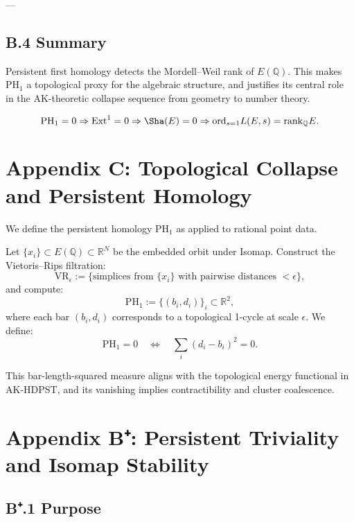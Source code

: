 ---

\subsection*{B.4 Summary}

Persistent first homology detects the Mordell--Weil rank of \( E(\mathbb{Q}) \).  
This makes \( \mathrm{PH}_1 \) a topological proxy for the algebraic structure, and justifies its central role  
in the AK-theoretic collapse sequence from geometry to number theory.

\[
\mathrm{PH}_1 = 0 \Rightarrow \mathrm{Ext}^1 = 0 \Rightarrow \Sha(E) = 0 \Rightarrow \mathrm{ord}_{s=1}L(E,s) = \mathrm{rank}_{\mathbb{Q}}E.
\]



\section*{Appendix C: Topological Collapse and Persistent Homology}

We define the persistent homology \( \mathrm{PH}_1 \) as applied to rational point data.

Let \( \{x_i\} \subset E(\mathbb{Q}) \subset \mathbb{R}^N \) be the embedded orbit under Isomap.  
Construct the Vietoris–Rips filtration:
\[
\mathrm{VR}_\epsilon := \{ \text{simplices from } \{x_i\} \text{ with pairwise distances } < \epsilon \},
\]
and compute:
\[
\mathrm{PH}_1 := \{ (b_i, d_i) \}_{i} \subset \mathbb{R}^2,
\]
where each bar \( (b_i, d_i) \) corresponds to a topological 1-cycle at scale \( \epsilon \).  
We define:
\[
\mathrm{PH}_1 = 0 \quad \Leftrightarrow \quad \sum_i (d_i - b_i)^2 = 0.
\]

This bar-length-squared measure aligns with the topological energy functional in AK-HDPST, and its vanishing implies contractibility and cluster coalescence.



\section*{Appendix B⁺: Persistent Triviality and Isomap Stability}

\subsection*{B⁺.1 Purpose}

